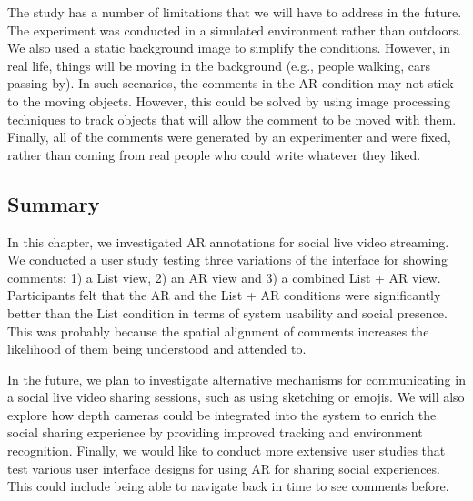 The study has a number of limitations that we will have to address in the future. The experiment was conducted in a simulated environment rather than outdoors. We also used a static background image to simplify the conditions. However, in real life, things will be moving in the background (e.g., people walking, cars passing by). In such scenarios, the comments in the AR condition may not stick to the moving objects. However, this could be solved by using image processing techniques to track objects that will allow the comment to be moved with them. Finally, all of the comments were generated by an experimenter and were fixed, rather than coming from real people who could write whatever they liked.    

\subsection{Summary}

In this chapter, we investigated AR annotations for social live video streaming. We conducted a user study testing three variations of the interface for showing comments: 1) a List view, 2) an AR view and 3) a combined List + AR view. Participants felt that the AR and the List + AR conditions were significantly better than the List condition in terms of system usability and social presence. This was probably because the spatial alignment of comments increases the likelihood of them being understood and attended to.

In the future, we plan to investigate alternative mechanisms for communicating in a social live video sharing sessions, such as using sketching or emojis. We will also explore how depth cameras could be integrated into the system to enrich the social sharing experience by providing improved tracking and environment recognition. Finally, we would like to conduct more extensive user studies that test various user interface designs for using AR for sharing social experiences. This could include being able to navigate back in time to see comments before. 
